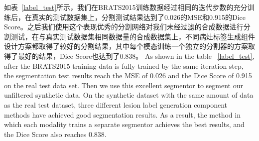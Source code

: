 \documentclass[letterpaper]{article} %
\begin{document}
如表~\ref{label_test}所示，我们在BRATS2015训练数据经过相同的迭代步数的充分训练后，在真实的测试数据集上，分割测试结果达到了0.026的MSE和0.915的Dice Score。之后我们使用这个表现优秀的分割网络对我们未经过滤的合成数据进行分割测试，在与真实测试数据集相同数据量的合成数据集上，不同病灶标签生成组件设计方案都取得了较好的分割结果，其中每个模态训练一个独立的分割器的方案取得了最好的结果，Dice Score也达到了0.838。
As shown in the table ~\ref{label_test}, after the BRATS2015 training data is fully trained by the same iteration step, the segmentation test results reach the MSE of 0.026 and the Dice Score of 0.915 on the real test data set. Then we use this excellent segmentor to segment our unfiltered synthetic data. On the synthetic dataset with the same amount of data as the real test dataset, three different lesion label generation component methods have achieved good segmentation results. As a result, the method in which each modality trains a separate segmentor achieves the best results, and the Dice Score also reaches 0.838.
\end{document}
